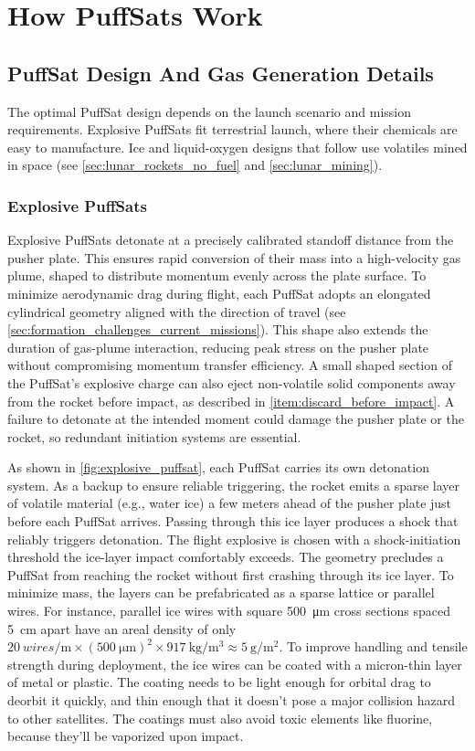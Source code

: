 \documentclass{article}
\begin{document}
\section{How PuffSats Work}\label{sec:how_puffsats_work}

\subsection{PuffSat Design And Gas Generation Details}\label{sec:puffsat_design}
The optimal PuffSat design depends on the launch scenario and mission requirements.  Explosive PuffSats fit terrestrial launch, where their chemicals are easy to manufacture.  Ice and liquid-oxygen designs that follow use volatiles mined in space (see \autoref{sec:lunar_rockets_no_fuel} and \autoref{sec:lunar_mining}).
\subsubsection{Explosive PuffSats} \label{sec:explosive_puffsat}
Explosive PuffSats detonate at a precisely calibrated standoff distance from the pusher plate. This ensures rapid conversion of their mass into a high-velocity gas plume, shaped to distribute momentum evenly across the plate surface.  To minimize aerodynamic drag during flight, each PuffSat adopts an elongated cylindrical geometry aligned with the direction of travel (see \autoref{sec:formation_challenges_current_missions}). This shape also extends the duration of gas-plume interaction, reducing peak stress on the pusher plate without compromising momentum transfer efficiency. A small shaped section of the PuffSat's explosive charge can also eject non-volatile solid components away from the rocket before impact, as described in \autoref{item:discard_before_impact}.  A failure to detonate at the intended moment could damage the pusher plate or the rocket, so redundant initiation systems are essential.

As shown in \autoref{fig:explosive_puffsat}, each PuffSat carries its own detonation system. As a backup to ensure reliable triggering, the rocket emits a sparse layer of volatile material (e.g., water ice) a few meters ahead of the pusher plate just before each PuffSat arrives. Passing through this ice layer produces a shock that reliably triggers detonation.  The flight explosive is chosen with a shock-initiation threshold the ice-layer impact comfortably exceeds. The geometry precludes a  PuffSat from reaching the rocket without first crashing through its ice layer. To minimize mass, the layers can be prefabricated as a sparse lattice or parallel wires. For instance, parallel ice wires with square \SI{500}{\micro\meter} cross sections  spaced \SI{5}{\centi\meter} apart have an areal density of only $\SI{20}{wires\per\meter} \times (\SI{500}{\micro\meter})^2 \times \SI{917}{\kilo\gram\per\cubic\meter} \approx \SI{5}{\gram\per\square\meter}$.  To improve handling and tensile strength during deployment, the ice wires can be coated with a micron-thin layer of metal or plastic. The coating needs to be light enough for orbital drag to deorbit it quickly, and thin enough that it doesn't pose a major collision hazard to other satellites. The coatings must also avoid toxic elements like fluorine, because they'll be vaporized upon impact.  
\end{document}
